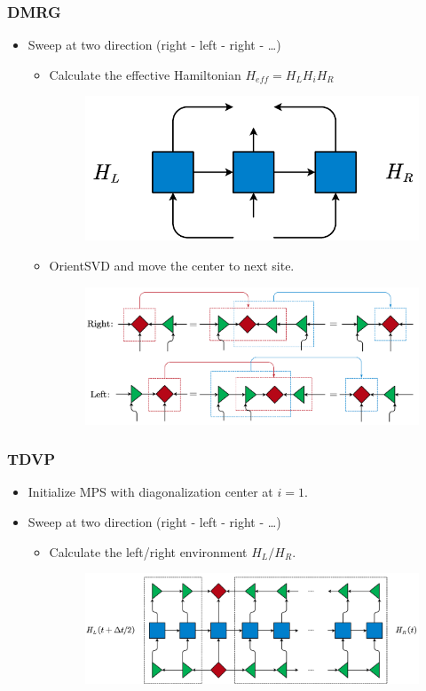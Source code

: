 \documentclass{beamer}
\begin{document}
\begin{frame}
	\frametitle{DMRG}
	\begin{itemize}
		\item Sweep at two direction (right - left - right - \dots)
		\begin{itemize}
			\item Calculate the effective Hamiltonian $H_{eff} = H_L H_i H_R$
			\begin{figure}[H]
				\includegraphics[width=0.3 \linewidth]{images/effH1.pdf}
			\end{figure}
			\item OrientSVD and move the center to next site.
			\begin{figure}[H]
				\includegraphics[width=0.6 \linewidth]{images/orientSVD.pdf}
			\end{figure}
		\end{itemize}
	\end{itemize}
\end{frame}


\begin{frame}
	\frametitle{TDVP}
	\begin{itemize}
		\item Initialize MPS with diagonalization center at $i=1$.
		\newpage
		\item Sweep at two direction (right - left - right - \dots)
		\begin{itemize}
			\item Calculate the left/right environment $H_L/H_R$.
			\begin{figure}[H]
				\includegraphics[width=0.8 \linewidth]{images/LRenv1 t.pdf}
			\end{figure}
		\end{itemize}
	\end{itemize}
\end{frame}
\end{document}
